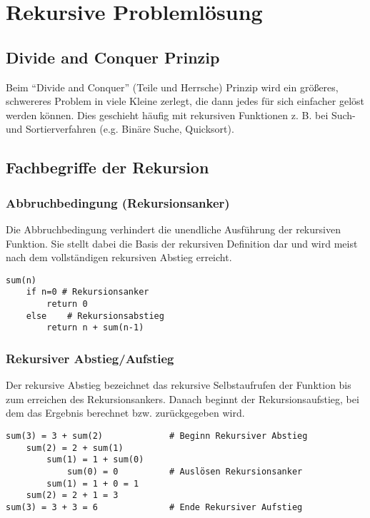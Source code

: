 \section{Rekursive Problemlösung}

\subsection{Divide and Conquer Prinzip}

Beim ``Divide and Conquer'' (Teile und Herrsche) Prinzip wird ein größeres, schwereres Problem
in viele Kleine zerlegt, die dann jedes für sich einfacher gelöst werden können.
Dies geschieht häufig mit rekursiven Funktionen z. B. bei Such- und Sortierverfahren
(e.g. Binäre Suche, Quicksort).

\subsection{Fachbegriffe der Rekursion}

\subsubsection{Abbruchbedingung (Rekursionsanker)}

Die Abbruchbedingung verhindert die unendliche Ausführung der rekursiven Funktion.
Sie stellt dabei die Basis der rekursiven Definition dar und wird meist nach dem vollständigen
rekursiven Abstieg erreicht.

\begin{lstlisting}
sum(n)
    if n=0 # Rekursionsanker
        return 0
    else    # Rekursionsabstieg
        return n + sum(n-1)
\end{lstlisting}

\subsubsection{Rekursiver Abstieg/Aufstieg}
\label{sec:rekursion_ab_auf}

Der rekursive Abstieg bezeichnet das rekursive Selbstaufrufen der Funktion bis zum
erreichen des Rekursionsankers. Danach beginnt der Rekursionsaufstieg, bei dem
das Ergebnis berechnet bzw. zurückgegeben wird.

\begin{lstlisting}
sum(3) = 3 + sum(2)             # Beginn Rekursiver Abstieg
    sum(2) = 2 + sum(1)
        sum(1) = 1 + sum(0)
            sum(0) = 0          # Auslösen Rekursionsanker
        sum(1) = 1 + 0 = 1
    sum(2) = 2 + 1 = 3
sum(3) = 3 + 3 = 6              # Ende Rekursiver Aufstieg
\end{lstlisting}

